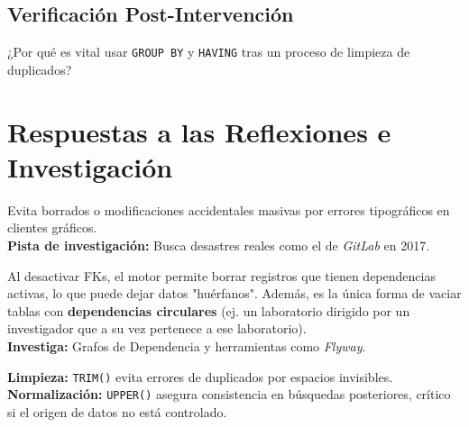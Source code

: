\documentclass[12pt,a4paper]{article}
\begin{document}



\subsection{Verificación Post-Intervención}


\begin{tcolorbox}[title=Reflexión 7]
¿Por qué es vital usar \texttt{GROUP BY} y \texttt{HAVING} tras un proceso de limpieza de duplicados?
\end{tcolorbox}

\newpage
\section{Respuestas a las Reflexiones e Investigación}

\begin{tcolorbox}[title=Respuesta 0: El Escudo de Seguridad]
Evita borrados o modificaciones accidentales masivas por errores tipográficos en clientes gráficos. \\
\textbf{Pista de investigación:} Busca desastres reales como el de \textit{GitLab} en 2017.
\end{tcolorbox}

\begin{tcolorbox}[title=Respuesta 1: Integridad y Dependencias Circulares]
Al desactivar FKs, el motor permite borrar registros que tienen dependencias activas, lo que puede dejar datos "huérfanos". 
%
Además, es la única forma de vaciar tablas con \textbf{dependencias circulares} (ej. un laboratorio dirigido por un investigador que a su vez pertenece a ese laboratorio). \\
\textbf{Investiga:} Grafos de Dependencia y herramientas como \textit{Flyway}.
\end{tcolorbox}

\begin{tcolorbox}[title=Respuesta 2: ETL y Calidad de Búsqueda]
\textbf{Limpieza:} \texttt{TRIM()} evita errores de duplicados por espacios invisibles. \\
\textbf{Normalización:} \texttt{UPPER()} asegura consistencia en búsquedas posteriores, crítico si el origen de datos no está controlado.
\end{tcolorbox}
\end{document}
